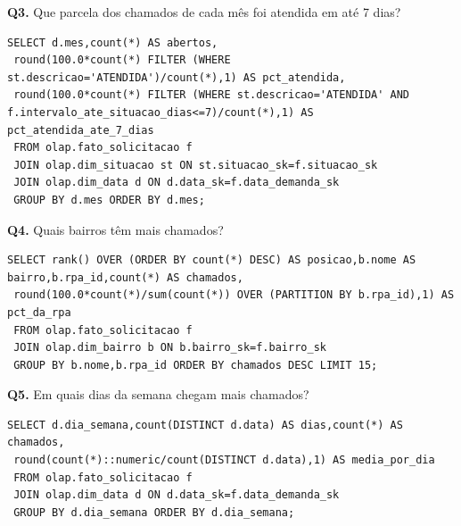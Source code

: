 \documentclass[12pt,a4paper]{article}
\begin{document}
\noindent\begin{minipage}{\textwidth}
\small\textbf{Q3.} Que parcela dos chamados de cada mês foi atendida em até 7 dias?\par\vspace{2pt}
\begin{lstlisting}
SELECT d.mes,count(*) AS abertos,
 round(100.0*count(*) FILTER (WHERE st.descricao='ATENDIDA')/count(*),1) AS pct_atendida,
 round(100.0*count(*) FILTER (WHERE st.descricao='ATENDIDA' AND f.intervalo_ate_situacao_dias<=7)/count(*),1) AS pct_atendida_ate_7_dias
 FROM olap.fato_solicitacao f
 JOIN olap.dim_situacao st ON st.situacao_sk=f.situacao_sk
 JOIN olap.dim_data d ON d.data_sk=f.data_demanda_sk
 GROUP BY d.mes ORDER BY d.mes;
\end{lstlisting}
\end{minipage}\par\vspace{8pt}
\noindent\begin{minipage}{\textwidth}
\small\textbf{Q4.} Quais bairros têm mais chamados?\par\vspace{2pt}
\begin{lstlisting}
SELECT rank() OVER (ORDER BY count(*) DESC) AS posicao,b.nome AS bairro,b.rpa_id,count(*) AS chamados,
 round(100.0*count(*)/sum(count(*)) OVER (PARTITION BY b.rpa_id),1) AS pct_da_rpa
 FROM olap.fato_solicitacao f
 JOIN olap.dim_bairro b ON b.bairro_sk=f.bairro_sk
 GROUP BY b.nome,b.rpa_id ORDER BY chamados DESC LIMIT 15;
\end{lstlisting}
\end{minipage}\par\vspace{8pt}
\noindent\begin{minipage}{\textwidth}
\small\textbf{Q5.} Em quais dias da semana chegam mais chamados?\par\vspace{2pt}
\begin{lstlisting}
SELECT d.dia_semana,count(DISTINCT d.data) AS dias,count(*) AS chamados,
 round(count(*)::numeric/count(DISTINCT d.data),1) AS media_por_dia
 FROM olap.fato_solicitacao f
 JOIN olap.dim_data d ON d.data_sk=f.data_demanda_sk
 GROUP BY d.dia_semana ORDER BY d.dia_semana;
\end{lstlisting}
\end{minipage}\par\vspace{8pt}
\end{document}
